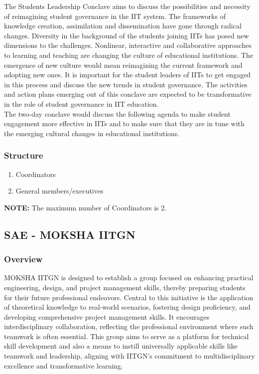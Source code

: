 \documentclass[12pt]{article}
\begin{document}
\noindent The Students Leadership Conclave aims to discuss the possibilities and necessity of reimagining student governance in the IIT system. The frameworks of knowledge creation, assimilation and dissemination have gone through radical changes. Diversity in the background of the students joining IITs has posed new dimensions to the challenges. Nonlinear, interactive and collaborative approaches to learning and teaching are changing the culture of educational institutions. The emergence of new culture would mean reimagining the current framework and adopting new ones. It is important for the student leaders of IITs to get engaged in this process and discuss the new trends in student governance. The activities and action plans emerging out of this conclave are expected to be transformative in the role of student governance in IIT education.\\

\noindent The two-day conclave would discuss the following agenda to make student engagement more effective in IITs and to make sure that they are in tune with the emerging cultural changes in educational institutions.

\subsubsection{Structure}
\begin{enumerate}
    \item Coordinators
    \item General members/executives
\end{enumerate}
\textbf{NOTE:} The maximum number of Coordinators is 2.


\subsection{SAE - MOKSHA IITGN}
\subsubsection{Overview}
MOKSHA IITGN is designed to establish a group focused on enhancing practical engineering, design, and project management skills, thereby preparing students for their future professional endeavors. Central to this initiative is the application of theoretical knowledge to real-world scenarios, fostering design proficiency, and developing comprehensive project management skills. It encourages interdisciplinary collaboration, reflecting the professional environment where such teamwork is often essential. This group aims to serve as a platform for technical skill development and also a means to instill universally applicable skills like teamwork and leadership, aligning with IITGN's commitment to multidisciplinary excellence and transformative learning.
\end{document}

